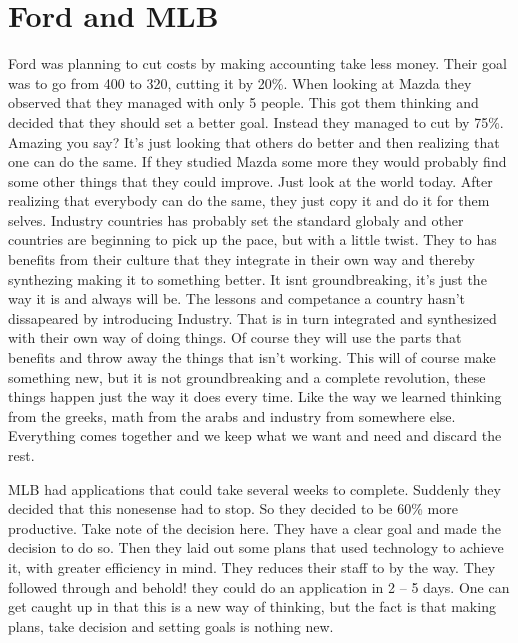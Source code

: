 \documentclass{article}
\begin{document}
\section{Ford and MLB}
Ford was planning to cut costs by making accounting take less money. Their goal was to go from 400 to 320, cutting it by 20\%. When looking at Mazda they observed that they managed with only 5 people. This got them thinking and decided that they should set a better goal. Instead they managed to cut by 75\%. Amazing you say? It's just looking that others do better and then realizing that one can do the same. If they studied Mazda some more they would probably find some other things that they could improve. Just look at the world today. After realizing that everybody can do the same, they just copy it and do it for them selves. Industry countries has probably set the standard globaly and other countries are beginning to pick up the pace, but with a little twist. They to has benefits from their culture that they integrate in their own way and thereby synthezing making it to something better. It isnt groundbreaking, it's just the way it is and always will be. The lessons and competance a country hasn't dissapeared by introducing Industry. That is in turn integrated and synthesized with their own way of doing things. Of course they will use the parts that benefits and throw away the things that isn't working. This will of course make something new, but it is not groundbreaking and a complete revolution, these things happen just the way it does every time. Like the way we learned thinking from the greeks, math from the arabs and industry from somewhere else. Everything comes together and we keep what we want and need and discard the rest.

MLB had applications that could take several weeks to complete. Suddenly they decided that this nonesense had to stop. So they decided to be 60\% more productive. Take note of the decision here. They have a clear goal and made the decision to do so. Then they laid out some plans that used technology to achieve it, with greater efficiency in mind. They reduces their staff to by the way. They followed through and behold! they could do an application in 2 -- 5 days. One can get caught up in that this is a new way of thinking, but the fact is that making plans, take decision and setting goals is nothing new. 
\end{document}
